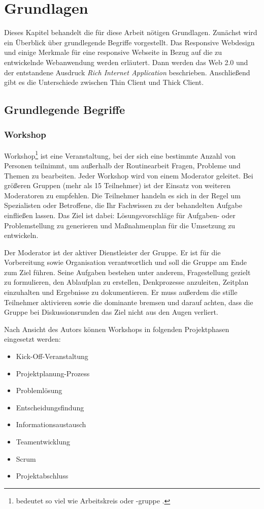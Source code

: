 \chapter{Grundlagen}
\label{sec:grundlagen}
Dieses Kapitel behandelt die für diese Arbeit nötigen Grundlagen. Zunächst wird ein Überblick über grundlegende Begriffe vorgestellt. Das Responsive Webdesign und einige Merkmale für eine responsive Webseite in Bezug auf die zu entwickelnde Webanwendung werden erläutert. Dann werden das Web 2.0 und der entstandene Ausdruck \textit{Rich Internet Application} beschrieben. Anschließend gibt es die Unterschiede zwischen Thin Client und Thick Client.

\section{Grundlegende Begriffe}
\label{sec:grundlegende begriffe}

\subsection{Workshop}
\label{sec:workshop}
Workshop\footnote{bedeutet so viel wie \glqq Arbeitskreis oder -gruppe\grqq{} .} ist eine Veranstaltung, bei der sich eine bestimmte Anzahl von Personen teilnimmt, um außerhalb der Routinearbeit Fragen, Probleme und Themen zu bearbeiten. Jeder Workshop wird von einem Moderator geleitet. Bei größeren Gruppen (mehr als 15 Teilnehmer) ist der Einsatz von weiteren Moderatoren zu empfehlen. Die Teilnehmer handeln es sich in der Regel um Spezialisten oder Betroffene, die Ihr Fachwissen zu der behandelten Aufgabe einfließen lassen. Das Ziel ist dabei: Lösungsvorschläge für Aufgaben- oder Problemstellung zu generieren und Maßnahmenplan für die Umsetzung zu entwickeln.\bigskip

Der Moderator ist der aktiver Dienstleister der Gruppe. Er ist für die Vorbereitung sowie Organisation verantwortlich und soll die Gruppe am Ende zum Ziel führen. Seine Aufgaben bestehen unter anderem, Fragestellung gezielt zu formulieren, den Ablaufplan zu erstellen, Denkprozesse anzuleiten, Zeitplan einzuhalten und Ergebnisse zu dokumentieren. Er muss außerdem die stille Teilnehmer aktivieren sowie die dominante bremsen und darauf achten, dass die Gruppe bei Diskussionsrunden das Ziel nicht aus den Augen verliert.\bigskip

Nach Ansicht des Autors \cite{Boh2016} können Workshops in folgenden Projektphasen eingesetzt werden:

\begin{itemize} 
\item Kick-Off-Veranstaltung
\item Projektplanung-Prozess
\item Problemlösung
\item Entscheidungsfindung
\item Informationsaustausch
\item Teamentwicklung
\item Scrum
\item Projektabschluss
\end{itemize}

